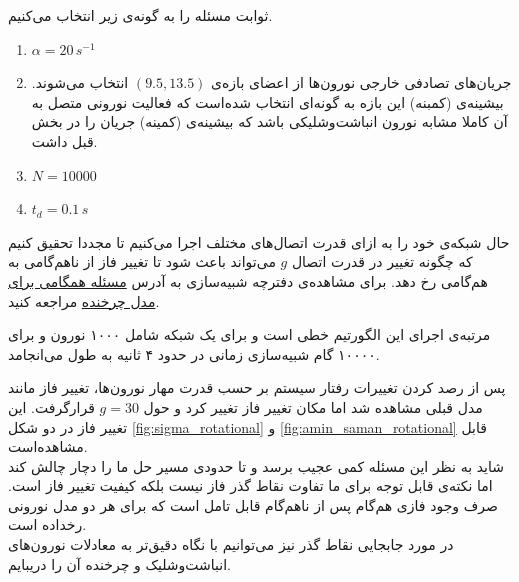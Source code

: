 ثوابت مسئله را به گونه‌ی زیر انتخاب می‌کنیم.
\begin{tcolorbox}[colback=green!5!white,colframe=green!75!black]
	\begin{enumerate}[*]
		\item
		$\alpha = 20\, s^{-1}$
		\item
		جریان‌های تصادفی خارجی نورون‌ها از اعضای بازه‌ی $(9.5,13.5)$ انتخاب می‌شوند. بیشینه‌ی (کمبنه) این بازه به گونه‌ای انتخاب شده‌است که فعالیت نورونی متصل به آن‌ کاملا مشابه نورون انباشت‌وشلیکی باشد که بیشینه‌ی (کمینه) جریان را در بخش قبل داشت. 
		\item
		$N = 10000$
		\item
		$t_d = 0.1\, s$ 
	\end{enumerate}
\end{tcolorbox}
حال شبکه‌ی خود را به ازای قدرت اتصال‌های مختلف اجرا می‌کنیم تا مجددا تحقیق کنیم که چگونه تغییر در قدرت اتصال $g$ می‌تواند باعث شود تا تغییر فاز از ناهم‌گامی به هم‌گامی رخ دهد. برای مشاهده‌ی دفترچه شبیه‌سازی به آدرس 
\href{run://..//scripts//rotational_model}{مسئله همگامی برای مدل چرخنده}
مراجعه کنید.

مرتبه‌ی اجرای این الگورتیم خطی است و برای یک شبکه شامل ۱۰۰۰ نورون و برای ۱۰۰۰۰ گام شبیه‌سازی زمانی در حدود ۴ ثانیه به طول می‌انجامد. 


پس از رصد کردن تغییرات رفتار سیستم بر حسب قدرت مهار نورون‌ها، تغییر فاز مانند مدل قبلی مشاهده شد اما مکان تغییر فاز تغییر کرد و حول $g=30$ قرارگرفت. این تغییر فاز در دو شکل \ref{fig:sigma_rotational} و \ref{fig:amin_saman_rotational}  قابل مشاهده‌است.\\
شاید به نظر این مسئله کمی عجیب برسد و تا حدودی مسیر حل ما را دچار چالش کند اما نکته‌ی قابل توجه برای ما تفاوت نقاط گذر فاز نیست بلکه کیفیت تغییر فاز است. صرف وجود فازی هم‌گام پس از نا‌هم‌گام قابل تامل است که برای هر دو مدل نورونی رخداده است.\\
در مورد جابجایی نقاط گذر نیز می‌توانیم با نگاه دقیق‌تر به معادلات نورون‌های انباشت‌وشلیک و چرخنده آن را دریبایم.\\

